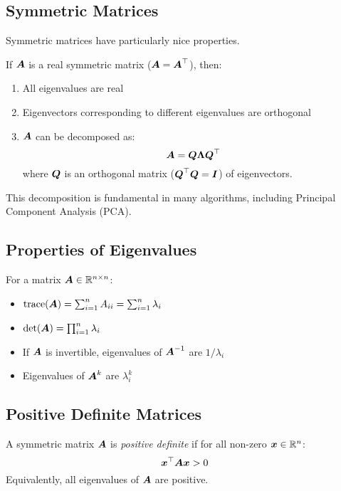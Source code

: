\subsection{Symmetric Matrices}

Symmetric matrices have particularly nice properties.

\begin{theorem}
If $\boldsymbol{A}$ is a real symmetric matrix ($\boldsymbol{A} = \boldsymbol{A}^\top$), then:
\begin{enumerate}
    \item All eigenvalues are real
    \item Eigenvectors corresponding to different eigenvalues are orthogonal
    \item $\boldsymbol{A}$ can be decomposed as:
    \begin{equation}
        \boldsymbol{A} = \boldsymbol{Q}\boldsymbol{\Lambda}\boldsymbol{Q}^\top
    \end{equation}
    where $\boldsymbol{Q}$ is an orthogonal matrix ($\boldsymbol{Q}^\top\boldsymbol{Q} = \boldsymbol{I}$) of eigenvectors.
\end{enumerate}
\end{theorem}

This decomposition is fundamental in many algorithms, including Principal Component Analysis (PCA).

\subsection{Properties of Eigenvalues}

For a matrix $\boldsymbol{A} \in \mathbb{R}^{n \times n}$:

\begin{itemize}
    \item $\text{trace}(\boldsymbol{A}) = \sum_{i=1}^{n} A_{ii} = \sum_{i=1}^{n} \lambda_i$
    \item $\det(\boldsymbol{A}) = \prod_{i=1}^{n} \lambda_i$
    \item If $\boldsymbol{A}$ is invertible, eigenvalues of $\boldsymbol{A}^{-1}$ are $1/\lambda_i$
    \item Eigenvalues of $\boldsymbol{A}^k$ are $\lambda_i^k$
\end{itemize}

\subsection{Positive Definite Matrices}

\begin{definition}
A symmetric matrix $\boldsymbol{A}$ is \emph{positive definite} if for all non-zero $\boldsymbol{x} \in \mathbb{R}^n$:
\begin{equation}
    \boldsymbol{x}^\top\boldsymbol{A}\boldsymbol{x} > 0
\end{equation}
Equivalently, all eigenvalues of $\boldsymbol{A}$ are positive.
\end{definition}

